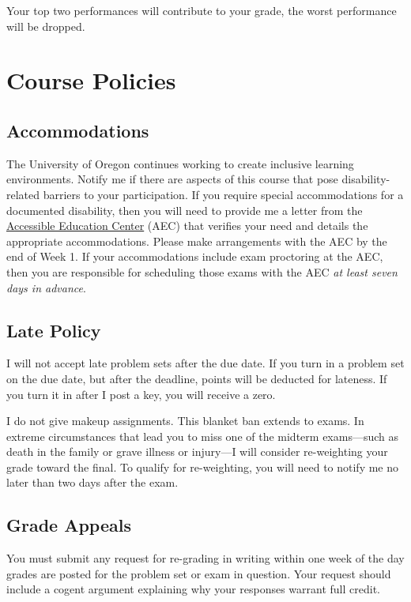 \documentclass[10pt]{article}
\begin{document}
\bigskip

Your top two performances will contribute to your grade, the worst performance will be dropped. 

\newpage

\section*{Course Policies}

\subsection*{Accommodations}

The University of Oregon continues working to create inclusive learning environments.
Notify me if there are aspects of this course that pose disability-related barriers to your participation. 
If you require special accommodations for a documented disability, then you will need to provide me a letter from the \href{https://aec.uoregon.edu/}{Accessible Education Center} (AEC) that verifies your need and details the appropriate accommodations. 
Please make arrangements with the AEC by the end of Week 1. If your accommodations include exam proctoring at the AEC, then you are responsible for scheduling those exams with the AEC \textit{at least seven days in advance}. 

\subsection*{Late Policy} 

I will not accept late problem sets after the due date. If you turn in a problem set on the due date, but after the deadline, points will be deducted for lateness. If you turn it in after I post a key, you will receive a zero.

\bigskip

\noindent I do not give makeup assignments. This blanket ban extends to exams. In extreme circumstances that lead you to miss one of the midterm exams---such as death in the family or grave illness or injury---I will consider re-weighting your grade toward the final. To qualify for re-weighting, you will need to notify me no later than two days after the exam.

\subsection*{Grade Appeals} 

You must submit any request for re-grading in writing within one week of the day grades are posted for the problem set or exam in question. Your request should include a cogent argument explaining why your responses warrant full credit.
\end{document}
